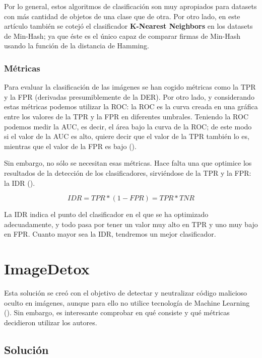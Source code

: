 Por lo general, estos algoritmos de clasificación son muy apropiados para datasets con más cantidad de objetos de una clase que de otra. Por otro lado, en este artículo también se cotejó el clasificador \textbf{K-Nearest Neighbors} en los datasets de Min-Hash; ya que éste es el único capaz de comparar firmas de Min-Hash usando la función de la distancia de Hamming.

\subsubsection{Métricas}

Para evaluar la clasificación de las imágenes se han cogido métricas como la \ac{TPR} y la \ac{FPR} (derivadas presumiblemente de la \ac{DER}). Por otro lado, y considerando estas métricas podemos utilizar la \ac{ROC}: la \ac{ROC} es la curva creada en una gráfica entre los valores de la \ac{TPR} y la \ac{FPR} en diferentes umbrales. Teniendo la \ac{ROC} podemos medir la \ac{AUC}, es decir, el área bajo la curva de la \ac{ROC}; de este modo si el valor de la \ac{AUC} es alto, quiere decir que el valor de la \ac{TPR} también lo es, mientras que el valor de la \ac{FPR} es bajo (\cite{auc}). %

Sin embargo, no sólo se necesitan esas métricas. Hace falta una que optimice los resultados de la detección de los clasificadores, sirviéndose de la \ac{TPR} y la \ac{FPR}: la \ac{IDR} (\cite{idr}). %

\begin{equation}
IDR = TPR*(1 - FPR) = TPR*TNR
\end{equation}

La \ac{IDR} indica el punto del clasificador en el que se ha optimizado adecuadamente, y todo pasa por tener un valor muy alto en \ac{TPR} y uno muy bajo en \ac{FPR}. Cuanto mayor sea la \ac{IDR}, tendremos un mejor clasificador.

\section{ImageDetox}

Esta solución se creó con el objetivo de detectar y neutralizar código malicioso oculto en imágenes, aunque para ello no utilice tecnología de Machine Learning (\cite{imagedetox}). Sin embargo, es interesante comprobar en qué consiste y qué métricas decidieron utilizar los autores. %

\subsection{Solución}

